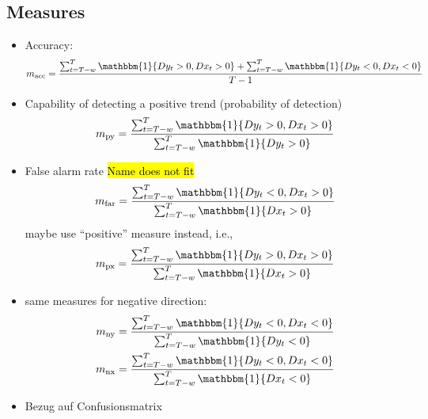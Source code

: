 \documentclass[oneside]{article}
\theoremstyle{plain}%
\theoremstyle{definition}
\newcommand{\ind}[1]{\mathbbm{1}\{#1\}}
\newcommand{\ydiff}{D y}
\newcommand{\xdiff}{Dx}
\begin{document}
\subsection{Measures}


\begin{itemize}
  \item Accuracy: \begin{equation}
  	m_{\text{acc}} = \frac{\sum_{t=T-w}^T \ind{\ydiff_t > 0, \xdiff_t > 0} + \sum_{t=T-w}^T \ind{\ydiff_t < 0, \xdiff_t < 0}}{T-1}
\end{equation}
	\item Capability of detecting a positive trend (probability of detection)
	\begin{equation}
  		m_{\text{py}} = \frac{\sum_{t=T-w}^T \ind{\ydiff_t > 0, \xdiff_t > 0}}{\sum_{t=T-w}^T \ind{\ydiff_t > 0}}
	\end{equation}
	\item False alarm rate \hl{Name does not fit} \begin{equation}
  m_{\text{far}} = \frac{\sum_{t=T-w}^T \ind{\ydiff_t < 0, \xdiff_t > 0}}{\sum_{t=T-w}^T \ind{\xdiff_t > 0}}
\end{equation}
maybe use \enquote{positive} measure instead, i.e.,
\begin{equation}
  m_{\text{px}} = \frac{\sum_{t=T-w}^T \ind{\ydiff_t > 0, \xdiff_t > 0}}{\sum_{t=T-w}^T \ind{\xdiff_t > 0}}  
\end{equation}
	\item same measures for negative direction:
	\begin{align}
		m_{\text{ny}} &=  \frac{\sum_{t=T-w}^T \ind{\ydiff_t < 0, \xdiff_t < 0}}{\sum_{t=T-w}^T \ind{\ydiff_t < 0}} \\
		m_{\text{nx}} &=  \frac{\sum_{t=T-w}^T \ind{\ydiff_t < 0, \xdiff_t < 0}}{\sum_{t=T-w}^T \ind{\xdiff_t < 0}}
	\end{align}
 \item Bezug auf Confusionsmatrix 
\end{itemize}
\end{document}
